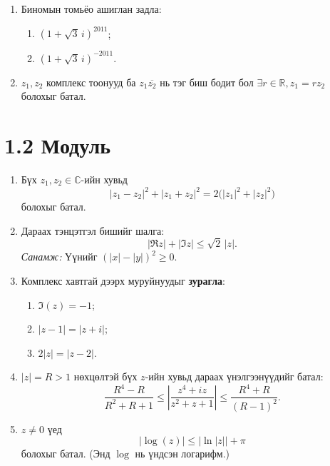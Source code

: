 \begin{enumerate}[label=\textbf{1.\arabic*}, itemsep=8pt]
\item Биномын томьёо ашиглан задла:
\begin{enumerate}[label=\textbf{(\alph*)}]
\item $(1+\sqrt{3}\,i)^{2011}$;
\item $(1+\sqrt{3}\,i)^{-2011}$.
\end{enumerate}

\item $z_1,z_2$ комплекс тоонууд ба $z_1\overline{z_2}$ нь тэг биш бодит бол $\exists r\in\mathbb{R},  z_1=r z_2$ болохыг батал.

\end{enumerate}

\section*{1.2 Модуль}
\begin{enumerate}[label=\textbf{2.\arabic*}, itemsep=8pt]

\item Бүх $z_1,z_2\in\mathbb C$-ийн хувьд
\[
|z_1-z_2|^2+|z_1+z_2|^2=2\big(|z_1|^2+|z_2|^2\big)
\]
болохыг батал.

\item Дараах тэнцэтгэл бишийг шалга:
\[
|\Re z|+|\Im z|\le \sqrt{2}\,|z|.
\]
\textit{Санамж:} Үүнийг $(|x|-|y|)^2\ge 0$.

\item Комплекс хавтгай дээрх муруйнуудыг \textbf{зурагла}:
\begin{enumerate}[label=\textbf{(\alph*)}]
\item $\Im(z)=-1$;
\item $|z-1|=|z+i|$;
\item $2|z|=|z-2|$.
\end{enumerate}

\item $|z|=R>1$ нөхцөлтэй бүх $z$-ийн хувьд дараах үнэлгээнүүдийг батал:
\[
\frac{R^4-R}{R^2+R+1}\le
\left|\frac{z^4+iz}{z^2+z+1}\right|
\le
\frac{R^4+R}{(R-1)^2}.
\]

\item $z\ne 0$ үед
\[
|\log(z)|\le |\ln|z||+\pi
\]
болохыг батал. (Энд $\log$ нь үндсэн логарифм.)

\end{enumerate}

